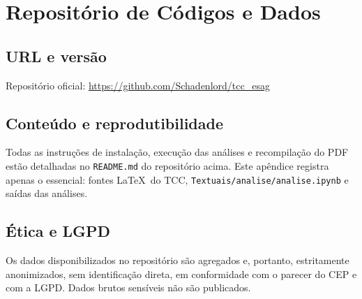 \begin{apendicesenv}
\begin{landscape}
\begin{ThreePartTable}
\begin{longtable}
\bottomrule 
\insertTableNotes 
\end{longtable} 
\end{ThreePartTable}


\endgroup
\end{landscape}

\chapter{Repositório de Códigos e Dados}\label{ap:repo}

\section*{URL e versão}
Repositório oficial: \url{https://github.com/Schadenlord/tcc_esag}

\section*{Conteúdo e reprodutibilidade}
Todas as instruções de instalação, execução das análises e recompilação do PDF
estão detalhadas no \texttt{README.md} do repositório acima.
Este apêndice registra apenas o essencial:
fontes \LaTeX\ do TCC, \texttt{Textuais/analise/analise.ipynb} e saídas das análises.

\section*{Ética e LGPD}
Os dados disponibilizados no repositório são agregados e, portanto, estritamente anonimizados, sem identificação direta, em conformidade com o parecer do CEP e com a LGPD. Dados brutos sensíveis não são publicados.


\end{apendicesenv}
